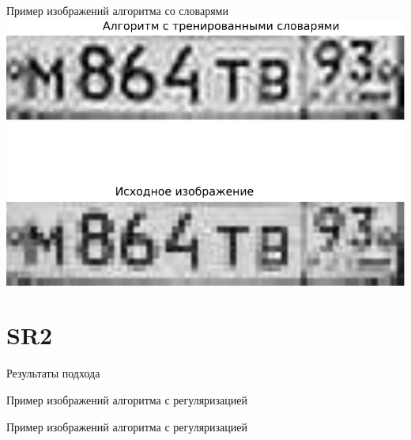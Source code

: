 \begin{frame}{Пример изображений алгоритма со словарями}
  \includegraphics[width=\columnwidth]{content/compare_result_sr1.pdf}
\end{frame}

\section{SR2}
\begin{frame}{Результаты подхода}
  
\end{frame}

\begin{frame}{Пример изображений алгоритма с регуляризацией}
  
\end{frame}

\begin{frame}{Пример изображений алгоритма с регуляризацией}
  
\end{frame}

